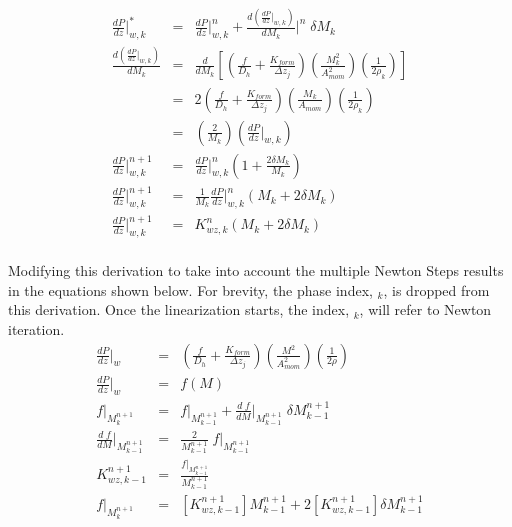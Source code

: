 \begin{eqnarray}
\frac{dP}{dz}\bigg\vert^{*}_{w,k} & = & \frac{dP}{dz}\bigg\vert^{n}_{w,k}+\frac{d (\frac{dP}{dz}\big\vert_{w,k})}{d M_k}\bigg\vert^{n}\;\delta M_k\\
\frac{d (\frac{dP}{dz}\big\vert_{w,k})}{d M_k} & = & \frac{d}{d M_k}\left[\left(\frac{f}{D_h}+\frac{K_{form}}{\Delta z_j}\right)\left(\frac{M^2_k}{A^2_{mom}}\right)\left(\frac{1}{2\rho_k}\right) \right]\\
& = & 2 \left(\frac{f}{D_h}+\frac{K_{form}}{\Delta z_j}\right)\left(\frac{M_k}{A_{mom}}\right)\left(\frac{1}{2\rho_k}\right)\\
& = & \left(\frac{2}{M_k}\right)\left(\frac{dP}{dz}\bigg\vert_{w,k}\right) \\
\frac{dP}{dz}\bigg\vert^{n+1}_{w,k} & = & \frac{dP}{dz}\bigg\vert^{n}_{w,k}\left(1+\frac{2 \delta M_k}{M_k}\right) \\
\frac{dP}{dz}\bigg\vert^{n+1}_{w,k} & = & \frac{1}{M_k}\frac{dP}{dz}\bigg\vert^{n}_{w,k}\left(M_k+2\delta M_k\right) \\
\frac{dP}{dz}\bigg\vert^{n+1}_{w,k} & = & K^{n}_{wz,k}\left(M_k+2\delta M_k\right) \\
\end{eqnarray}

Modifying this derivation to take into account the multiple Newton Steps results in the equations shown below. For brevity, the phase index, $_k$, is dropped from this derivation. Once the linearization starts, the index, $_k$, will refer to Newton iteration. 
\begin{eqnarray}
\label{NewPressureLoss}
\frac{dP}{dz}\bigg\vert_{w}& = & \left(\frac{f}{D_h}+\frac{K_{form}}{\Delta z_j}\right)\left(\frac{M^2}{A^2_{mom}}\right)\left(\frac{1}{2\rho}\right)\\
\frac{dP}{dz}\bigg\vert_{w} & = & f(M) \\
f|_{M^{n+1}_{k}} & = & f|_{M^{n+1}_{k-1}}+\frac{d\; f }{d M}\bigg\vert_{M_{k-1}^{n+1}}\;\delta M^{n+1}_{k-1}\\
\frac{d\; f }{d M}\bigg\vert_{M_{k-1}^{n+1}} & = & \frac{2}{M^{n+1}_{k-1}}\; f|_{M^{n+1}_{k-1}}\\
K^{n+1}_{wz,k-1} & = & \frac{f|_{M^{n+1}_{k-1}}}{M^{n+1}_{k-1}} \\
f|_{M^{n+1}_{k}} & = & [K^{n+1}_{wz,k-1}] M_{k-1}^{n+1}+2 \left[K^{n+1}_{wz,k-1} \right]\delta M^{n+1}_{k-1}
\end{eqnarray}

